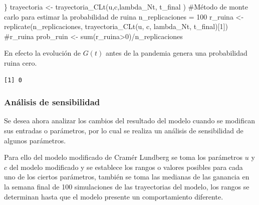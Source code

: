 \documentclass[
  us-letterpaper,
]{scrreprt}
\newenvironment{Shaded}{\begin{snugshade}}{\end{snugshade}}
\newcommand{\CommentTok}[1]{\textcolor[rgb]{0.37,0.37,0.37}{#1}}
\newcommand{\DecValTok}[1]{\textcolor[rgb]{0.68,0.00,0.00}{#1}}
\newcommand{\FunctionTok}[1]{\textcolor[rgb]{0.28,0.35,0.67}{#1}}
\newcommand{\NormalTok}[1]{\textcolor[rgb]{0.00,0.23,0.31}{#1}}
\newcommand{\OtherTok}[1]{\textcolor[rgb]{0.00,0.23,0.31}{#1}}
\newcommand{\SpecialCharTok}[1]{\textcolor[rgb]{0.37,0.37,0.37}{#1}}
\theoremstyle{definition}
\theoremstyle{plain}
\theoremstyle{plain}
\theoremstyle{remark}
\begin{document}
\begin{Shaded}
\begin{Highlighting}[]
\NormalTok{\}}
\NormalTok{trayectoria }\OtherTok{\textless{}{-}} \FunctionTok{trayectoria\_CLt}\NormalTok{(u,c,lambda\_Nt, t\_final )}
\CommentTok{\#Método de monte carlo para estimar la probabilidad de ruina}
\NormalTok{n\_replicaciones }\OtherTok{=} \DecValTok{100}
\NormalTok{r\_ruina }\OtherTok{\textless{}{-}} \FunctionTok{replicate}\NormalTok{(n\_replicaciones, }
            \FunctionTok{trayectoria\_CLt}\NormalTok{(u, c, lambda\_Nt, t\_final)[}\DecValTok{1}\NormalTok{])}
\CommentTok{\#r\_ruina}
\NormalTok{prob\_ruin }\OtherTok{\textless{}{-}} \FunctionTok{sum}\NormalTok{(r\_ruina}\SpecialCharTok{\textgreater{}}\DecValTok{0}\NormalTok{)}\SpecialCharTok{/}\NormalTok{n\_replicaciones}
\end{Highlighting}
\end{Shaded}

En efecto la evolución de \(G(t)\) antes de la pandemia genera una
probabilidad ruina cero.

\begin{verbatim}
[1] 0
\end{verbatim}

\subsubsection{Análisis de
sensibilidad}\label{anuxe1lisis-de-sensibilidad}

Se desea ahora analizar los cambios del resultado del modelo cuando se
modifican sus entradas o parámetros, por lo cual se realiza un análisis
de sensibilidad de algunos parámetros.

Para ello del modelo modificado de Cramér Lundberg se toma los
parámetros \(u\) y \(c\) del modelo modificado y se establece los rangos
o valores posibles para cada uno de los ciertos parámetros, también se
toma las medianas de las ganancia en la semana final de 100 simulaciones
de las trayectorias del modelo, los rangos se determinan hasta que el
modelo presente un comportamiento diferente.
\end{document}
